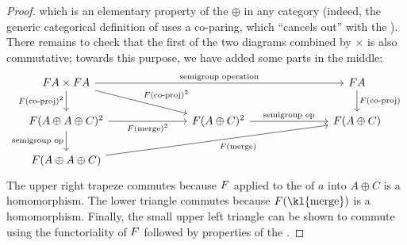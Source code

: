 \begin{proof}
    which is an elementary property of the  $\oplus$ in any category (indeed, the generic categorical definition of  uses a co-paring, which \enquote{cancels out} with the ).
    There remains to check that the first of the two diagrams combined by $\times$ is also commutative; towards this purpose, we have added some parts in the middle:
    \[\begin{tikzcd}
        [column sep=2.5cm]
        \functor A\times \functor A
        \ar[d,"\functor(\text{co-proj})^2"']
        \ar[dr,"\functor(\text{co-proj})^2"]
        \ar[rr,"\text{semigroup operation}"]
        &
        &
        \functor A
        \ar[d,"\functor(\text{co-proj})"]
        \\
        \functor(A \oplus A \oplus C)^2
        \ar[d,"\text{semigroup op}"']
        \ar[r,"F(\text{merge})^2"']
        &
        \functor(A \oplus C)^2
        \ar[r,"\text{semigroup op}"]
        &
        \functor(A \oplus C)
        \\
        \functor(A \oplus A \oplus C)
            \ar[rru,"F(\text{merge})"']
    \end{tikzcd}\]
    The upper right trapeze commutes because $\functor$ applied to the  of $a$ into $A\oplus C$ is a homomorphism. The lower triangle commutes because $\functor(\text{\kl{merge}})$ is a homomorphism. Finally, the small upper left triangle can be shown to commute using the functoriality of $\functor$ followed by properties of the .
\end{proof}
